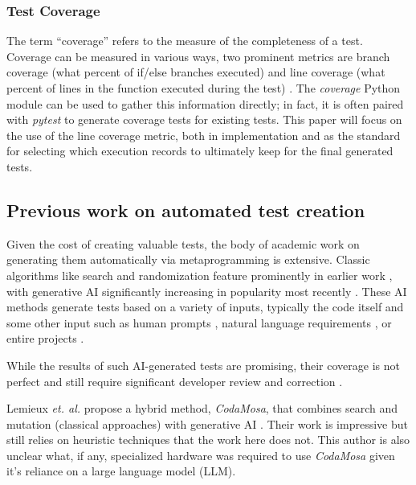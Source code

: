 \subsubsection{Test Coverage}\label{sec:intro-cov}
The term “coverage” refers to the measure of the completeness of a test.  
Coverage can be measured in various ways, two prominent metrics are branch coverage 
(what percent of if/else branches executed) and line coverage 
(what percent of lines in the function executed during the test) 
\cite{wang2024software}. The \textit{coverage} Python module can
be used to gather this information directly; in fact, it is often paired with 
\textit{pytest} to generate coverage tests for existing tests. This paper will focus 
on the use of the line coverage metric, both in implementation and 
as the standard for selecting which execution records to ultimately 
keep for the final generated tests.

\subsection{Previous work on automated test creation}\label{sec:intro-3}

Given the cost of creating valuable tests,
the body of academic work on generating them automatically 
via metaprogramming is extensive. Classic algorithms like search 
and randomization feature prominently in earlier work 
\cite{Luk22Pynguin0170}, with generative AI significantly increasing in 
popularity most recently
\cite{bhatia2023unit,takerngsaksiri2024tdd,wang2024software, kahur2023java}.
%
These AI methods generate tests based on a variety of inputs, typically the code
itself and some other input such as human prompts 
\cite{lahiri2023interactivecodegenerationtestdriven},
natural language requirements \cite{wang2024software}, or entire projects
\cite{rao2023cat}.  

While the results of such AI-generated tests are promising,
their coverage is not perfect \cite{kahur2023java} and still require significant
developer review and correction \cite{sundqvist2024ai}.  

Lemieux \textit{et. al.} propose a hybrid method, \textit{CodaMosa}, that 
combines search and mutation (classical approaches) with generative AI
\cite{lemieux2023codamosa}.  Their work is impressive but still relies on 
heuristic techniques that the work here does not. This author is also unclear 
what, if any, specialized hardware was required to use \textit{CodaMosa} given
it's reliance on a large language model (LLM).

